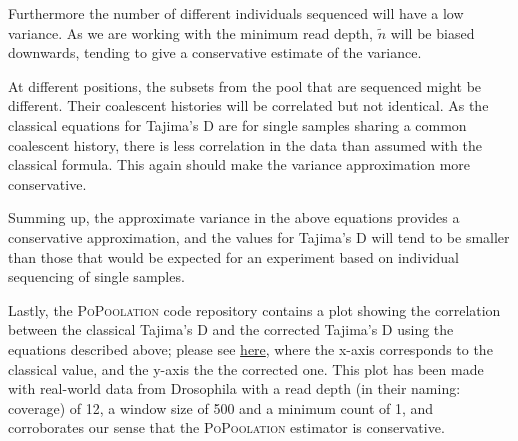 \documentclass[letterpaper,fontsize=9pt,DIV=12]{scrartcl}
\newcounter{todo}
\newcommand\todo[1]{}
\newcommand\toolname{\textsc}
\begin{document}
Furthermore the number of different individuals sequenced will have a low variance.
As we are working with the minimum read depth, $\tilde{n}$ will be biased downwards,
tending to give a conservative estimate of the variance.

At different positions, the subsets from the pool that are sequenced might be different.
Their coalescent histories will be correlated but not identical.
As the classical equations for Tajima's D are for single samples sharing a common coalescent history,
there is less correlation in the data than assumed with the classical formula.
This again should make the variance approximation more conservative.

Summing up, the approximate variance in the above equations provides a conservative approximation,
and the values for Tajima's D will tend to be smaller than those that would be expected
for an experiment based on individual sequencing of single samples.

Lastly, the \toolname{PoPoolation} code repository contains a plot showing the correlation between the classical Tajima's D
and the corrected Tajima's D using the equations described above;
please see \href{https://github.com/lczech/popoolation/raw/master/files/correlation_classic_correctedTajimasD.png}{here},
where the x-axis corresponds to the classical value, and the y-axis the the corrected one.
This plot has been made with real-world data from Drosophila with a read depth (in their naming: coverage) of 12,
a window size of 500 and a minimum count of 1, and corroborates our sense that the \toolname{PoPoolation} estimator is conservative.




\end{document}
